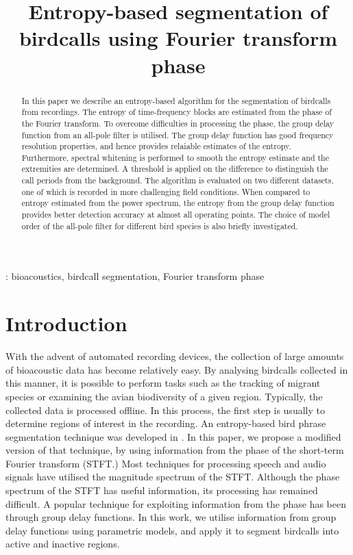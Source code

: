 \documentclass[a4paper]{article}
\title{Entropy-based segmentation of birdcalls using Fourier transform phase}
\begin{document}
  \maketitle
  \begin{abstract}
  In this  paper we describe an entropy-based algorithm for the segmentation of
  birdcalls from recordings. The entropy of time-frequency blocks are estimated
  from the phase of the Fourier transform. To overcome difficulties in
  processing the phase, the group delay function from an all-pole filter is
  utilised. The group delay function has good frequency resolution properties,
  and hence provides relaiable estimates of the entropy. Furthermore, spectral
  whitening is performed to smooth the entropy estimate and the extremities are
  determined. A threshold is applied on the difference to distinguish the call
  periods from the background.  The algorithm is evaluated on two different
  datasets, one of which is recorded in more challenging field conditions. When
  compared to entropy estimated from the power spectrum, the entropy from the
  group delay function provides better detection accuracy at almost all
  operating points. The choice of model order of the all-pole filter for
  different bird species is also briefly investigated.
  \end{abstract}
  : bioacoustics, birdcall segmentation, Fourier transform phase
  



\section{Introduction}

With the advent of automated recording devices, the collection of large amounts of
bioacoustic data has become relatively easy. By analysing birdcalls collected in
this manner, it is possible to perform tasks such as the tracking of migrant
species or examining the avian biodiversity of a given region. Typically, the
collected data is processed offline. In this process, the first step is usually to
determine regions of interest in the recording. An entropy-based bird phrase segmentation
technique was developed in \cite{wang2013}. In this paper, we propose a modified
version of that technique, by using information from the phase of the short-term
Fourier transform (STFT.) Most techniques for processing speech and audio signals have
utilised the magnitude spectrum of the STFT. Although the phase spectrum of the STFT has 
useful information, its processing has remained difficult. A popular technique
for exploiting information from the phase has been through group delay functions. In
this work, we utilise information from group delay functions using parametric
models, and apply it to segment birdcalls into active and inactive regions.
\end{document}
